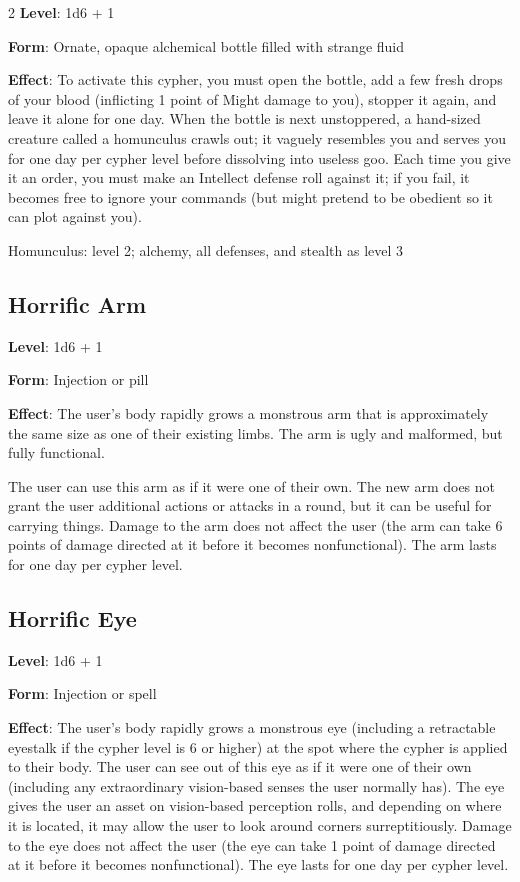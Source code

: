 \begin{multicols}{2}
\textbf{Level}: 1d6 + 1

\textbf{Form}: Ornate, opaque alchemical bottle filled with strange fluid

\textbf{Effect}: To activate this cypher, you must open the bottle, add a few fresh drops of your blood (inflicting 1 point of Might damage to you), stopper it again, and leave it alone for one day. When the bottle is next unstoppered, a hand-sized creature called a homunculus crawls out; it vaguely resembles you and serves you for one day per cypher level before dissolving into useless goo. Each time you give it an order, you must make an Intellect defense roll against it; if you fail, it becomes free to ignore your commands (but might pretend to be obedient so it can plot against you).

Homunculus: level 2; alchemy, all defenses, and stealth as level 3

\subsection{Horrific Arm}

\textbf{Level}: 1d6 + 1

\textbf{Form}: Injection or pill

\textbf{Effect}: The user’s body rapidly grows a monstrous arm that is approximately the same size as one of their existing limbs. The arm is ugly and malformed, but fully functional.

The user can use this arm as if it were one of their own. The new arm does not grant the user additional actions or attacks in a round, but it can be useful for carrying things. Damage to the arm does not affect the user (the arm can take 6 points of damage directed at it before it becomes nonfunctional). The arm lasts for one day per cypher level.

\subsection{Horrific Eye}

\textbf{Level}: 1d6 + 1

\textbf{Form}: Injection or spell

\textbf{Effect}: The user’s body rapidly grows a monstrous eye (including a retractable eyestalk if the cypher level is 6 or higher) at the spot where the cypher is applied to their body. The user can see out of this eye as if it were one of their own (including any extraordinary vision-based senses the user normally has). The eye gives the user an asset on vision-based perception rolls, and depending on where it is located, it may allow the user to look around corners surreptitiously. Damage to the eye does not affect the user (the eye can take 1 point of damage directed at it before it becomes nonfunctional). The eye lasts for one day per cypher level.


\end{multicols}

